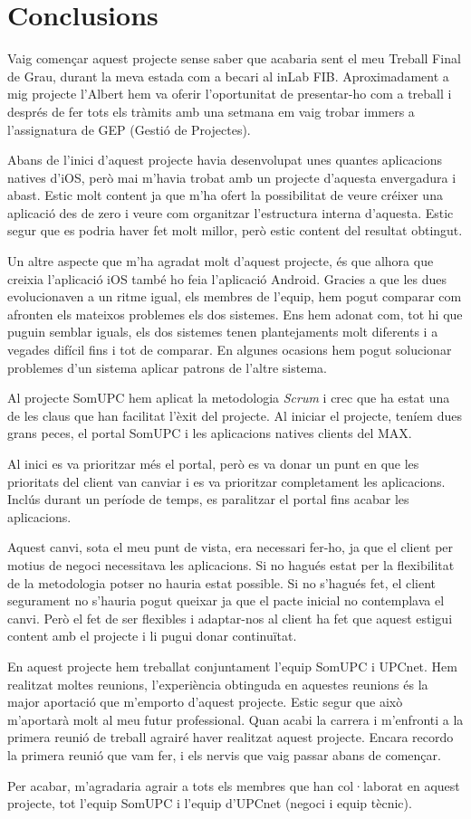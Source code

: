 
\section{Conclusions}

Vaig començar aquest projecte sense saber que acabaria sent el meu Treball Final de Grau, durant la meva estada com a becari al inLab FIB. Aproximadament a mig projecte l'Albert hem va oferir l'oportunitat de presentar-ho com a treball i després de fer tots els tràmits amb una setmana em vaig trobar immers a l'assignatura de GEP (Gestió de Projectes).

Abans de l'inici d'aquest projecte havia desenvolupat unes quantes aplicacions natives d'iOS, però mai m'havia trobat amb un projecte d'aquesta envergadura i abast. Estic molt content ja que m'ha ofert la possibilitat de veure créixer una aplicació des de zero i veure com organitzar l'estructura interna d'aquesta. Estic segur que es podria haver fet molt millor, però estic content del resultat obtingut.

Un altre aspecte que m'ha agradat molt d'aquest projecte, és que alhora que creixia l'aplicació iOS també ho feia l'aplicació Android. Gracies a que les dues evolucionaven a un ritme igual, els membres de l'equip, hem pogut comparar com afronten els mateixos problemes els dos sistemes. Ens hem adonat com, tot hi que puguin semblar iguals, els dos sistemes tenen plantejaments molt diferents i a vegades difícil fins i tot de comparar. En algunes ocasions hem pogut solucionar problemes d'un sistema aplicar patrons de l'altre sistema.

Al projecte SomUPC hem aplicat la metodologia \textit{Scrum} i crec que ha estat una de les claus que han facilitat l'èxit del projecte. Al iniciar el projecte, teníem dues grans peces, el portal SomUPC i les aplicacions natives clients del MAX.

Al inici es va prioritzar més el portal, però es va donar un punt en que les prioritats del client van canviar i es va prioritzar completament les aplicacions. Inclús durant un període de temps, es paralitzar el portal fins acabar les aplicacions. 

Aquest canvi, sota el meu punt de vista, era necessari fer-ho, ja que el client per motius de negoci necessitava les aplicacions. Si no hagués estat per la flexibilitat de la metodologia potser no hauria estat possible. Si no s'hagués fet, el client segurament no s'hauria pogut queixar ja que el pacte inicial no contemplava el canvi. Però el fet de ser flexibles i adaptar-nos al client ha fet que aquest estigui content amb el projecte i li pugui donar continuïtat.

En aquest projecte hem treballat conjuntament l'equip SomUPC i UPCnet. Hem realitzat moltes reunions, l'experiència obtinguda en aquestes reunions és la major aportació que m'emporto d'aquest projecte. Estic segur que això m'aportarà molt al meu futur professional. Quan acabi la carrera i m'enfronti a la primera reunió de treball agrairé haver realitzat aquest projecte. Encara recordo la primera reunió que vam fer, i els nervis que vaig passar abans de començar.

Per acabar, m'agradaria agrair a tots els membres que han col·laborat en aquest projecte, tot l'equip SomUPC i l'equip d'UPCnet (negoci i equip tècnic).
